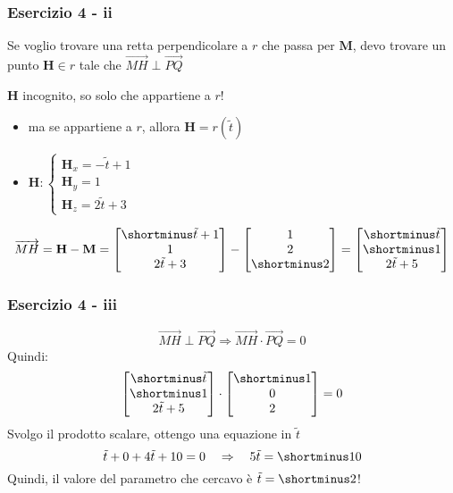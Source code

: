 \documentclass{beamer}
\begin{document}
\begin{frame}
\frametitle{Esercizio 4 - ii}
Se voglio trovare una retta perpendicolare a $r$ che passa per $\mathbf M$, devo trovare un punto
$\mathbf H \in r$ tale che $\overrightarrow{MH} \perp \overrightarrow{PQ}$

\vspace{0.4cm}
    $\mathbf H$ incognito, so solo che appartiene a $r$!
\begin{itemize}
    \item ma se appartiene a $r$, allora $\mathbf H = r(\tilde{t})$
    \item $\mathbf H :\begin{cases} \mathbf H_x = -\tilde t +1\\ \mathbf H_y = 1 \\ \mathbf H_z = 2 \tilde t+3 \end{cases}$
\end{itemize}

\vspace{0.4cm}
$$
\overrightarrow{MH}
    =
    \mathbf H - \mathbf M
    =
    \begin{bmatrix}\shortminus \tilde t + 1\\ 1 \\ 2 \tilde t+3 \end{bmatrix} - \begin{bmatrix}1 \\ 2 \\ \shortminus 2 \end{bmatrix}
    =
    \begin{bmatrix}\shortminus \tilde t \\ \shortminus 1 \\ 2 \tilde t+5 \end{bmatrix}
$$
\end{frame}

\begin{frame}
\frametitle{Esercizio 4 - iii}
\begin{displaymath}
\overrightarrow{MH} \perp \overrightarrow{PQ} 
    \Rightarrow  
\overrightarrow{MH} \cdot \overrightarrow{PQ} = 0  
\end{displaymath}
Quindi:
$$
    \begin{bmatrix}\shortminus \tilde t \\ \shortminus 1 \\ 2 \tilde t+5 \end{bmatrix}
        \cdot
    \begin{bmatrix}\shortminus 1 \\ 0 \\ 2 \end{bmatrix} = 0
$$
Svolgo il prodotto scalare, ottengo una equazione in $\tilde t$
$$
    \tilde t + 0 + 4 \tilde t + 10 = 0 \quad \Rightarrow \quad 5 \tilde t = \shortminus 10
$$
    Quindi, il valore del parametro che cercavo \`e $\tilde t = \shortminus 2$!
\end{frame}
\end{document}
